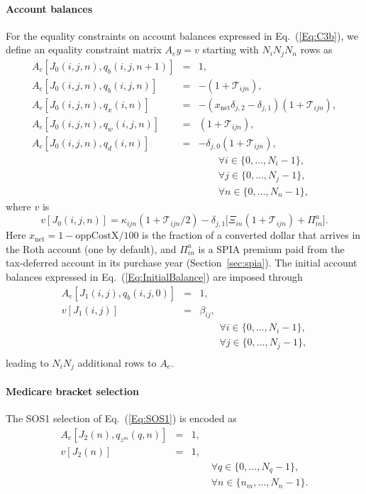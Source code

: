 \documentclass[fleqn,12pt]{report}
\begin{document}
\paragraph*{Account balances}
For the equality constraints on account balances expressed in Eq.~(\ref{Eq:C3b}),
we define an equality constraint matrix $A_ey = v$ starting
with $N_iN_jN_n$ rows as
\begin{eqnarray}
	\label{Eq:B1}
	A_e[J_0(i, j, n), q_b(i, j, n+1)] &=& 1, \nonumber \\
	A_e[J_0(i, j, n), q_b(i, j, n)] &=& -(1 + \mathcal{T}_{ijn}), \nonumber \\
	A_e[J_0(i, j, n), q_x(i, n)] &=& -(x_{\mathrm{net}}\delta_{j, 2} - \delta_{j, 1})(1 + \mathcal{T}_{ijn}), \nonumber \\
	A_e[J_0(i, j, n), q_w(i, j, n)] &=& (1 + \mathcal{T}_{ijn}), \nonumber \\
	A_e[J_0(i, j, n), q_d(i, n)] &=& -\delta_{j, 0}(1 + \mathcal{T}_{ijn}), \\
	&&\qquad\forall i \in \{0,\ldots, N_i-1\},\nonumber\\
	&&\qquad\forall j \in \{0,\ldots, N_j-1\},\nonumber\\
	&&\qquad\forall n \in \{0,\ldots, N_n-1\}, \nonumber
\end{eqnarray}
where $v$ is
\begin{equation}
	v[J_0(i, j, n)] = \kappa_{ijn}(1 + \mathcal{T}_{ijn}/2)
	- \delta_{j, 1}\bigl[\Xi_{in}(1 + \mathcal{T}_{ijn}) + \Pi^{a}_{in}\bigr].
\end{equation}
Here $x_{\mathrm{net}} = 1 - \textrm{oppCostX}/100$ is the fraction of a converted dollar
that arrives in the Roth account (one by default), and $\Pi^{a}_{in}$ is a SPIA premium paid
from the tax-deferred account in its purchase year (Section~\ref{sec:spia}).
The initial account balances expressed in Eq.~(\ref{Eq:InitialBalance}) are imposed through
\begin{eqnarray}
	A_e[J_1(i, j), q_b(i, j, 0)] &=& 1, \nonumber \\
	v[J_1(i, j)] &=& \beta_{ij},  \\
	&&\qquad\forall i \in \{0,\ldots, N_i-1\},\nonumber\\
	&&\qquad\forall j \in \{0,\ldots, N_j-1\},\nonumber\\
\end{eqnarray}
leading to $N_i N_j$ additional rows to $A_e$.

\paragraph*{Medicare bracket selection}
The SOS1 selection of Eq.~(\ref{Eq:SOS1}) is encoded as
\begin{eqnarray}
	A_e[J_2(n), q_{z^m}(q, n)] &=& 1, \nonumber \\
	v[J_2(n)] &=& 1, \nonumber \\
	&&\qquad\forall q \in \{0,\ldots, N_q - 1\}, \nonumber\\
	&&\qquad\forall n \in \{n_m,\ldots, N_n - 1\}.
\end{eqnarray}
\end{document}

